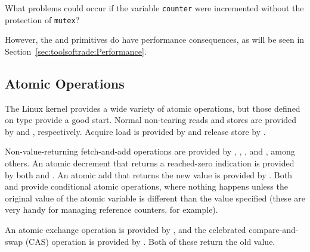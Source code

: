\QuickQuiz{}
	What problems could occur if the variable {\tt counter} were
	incremented without the protection of {\tt mutex}?
 \QuickQuizEnd

However, the  and  primitives
do have performance consequences, as will be seen in
Section~\ref{sec:toolsoftrade:Performance}.

\subsection{Atomic Operations}
\label{sec:toolsoftrade:Atomic Operations}

The Linux kernel provides a wide variety of atomic operations, but
those defined on type  provide a good start.
Normal non-tearing reads and stores are provided by
 and , respectively.
Acquire load is provided by  and release
store by .

Non-value-returning fetch-and-add operations are provided by
, , , and
, among others.
An atomic decrement that returns a reached-zero indication is provided
by both  and .
An atomic add that returns the new value is provided by
.
Both  and  provide
conditional atomic operations, where nothing happens unless the
original value of the atomic variable is different than the value
specified (these are very handy for managing reference counters, for
example).

An atomic exchange operation is provided by , and
the celebrated compare-and-swap (CAS) operation is provided by
.
Both of these return the old value.

